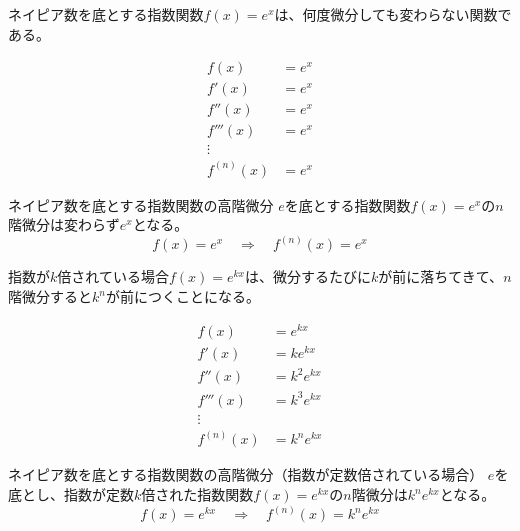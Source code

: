 \documentclass[../../imaging-math]{subfiles}
\begin{document}
ネイピア数を底とする指数関数$f(x)=e^x$は、何度微分しても変わらない関数である。

\begin{align}
  f(x)       & = e^x \\
  f'(x)      & = e^x \\
  f''(x)     & = e^x \\
  f'''(x)    & = e^x \\
  \vdots     &       \\
  f^{(n)}(x) & = e^x
\end{align}

\begin{theorem}{ネイピア数を底とする指数関数の高階微分}
  \newline
  $e$を底とする指数関数$f(x) = e^x$の$n$階微分は変わらず$e^x$となる。
  \LARGE
  \begin{equation}
    f(x) = e^{x} \quad \Longrightarrow \quad f^{(n)}(x) = e^{x}
  \end{equation}
\end{theorem}

指数が$k$倍されている場合$f(x)=e^{kx}$は、微分するたびに$k$が前に落ちてきて、$n$階微分すると$k^n$が前につくことになる。

\begin{align}
  f(x)       & = e^{kx}     \\
  f'(x)      & = ke^{kx}    \\
  f''(x)     & = k^2 e^{kx} \\
  f'''(x)    & = k^3 e^{kx} \\
  \vdots     &              \\
  f^{(n)}(x) & = k^ne^{kx}
\end{align}

\begin{theorem}{ネイピア数を底とする指数関数の高階微分（指数が定数倍されている場合）}
  \newline
  $e$を底とし、指数が定数$k$倍された指数関数$f(x) = e^{kx}$の$n$階微分は$k^n e^{kx}$となる。
  \LARGE
  \begin{equation}
    f(x) = e^{kx} \quad \Longrightarrow \quad f^{(n)}(x) = k^n e^{kx}
  \end{equation}
\end{theorem}
\end{document}

